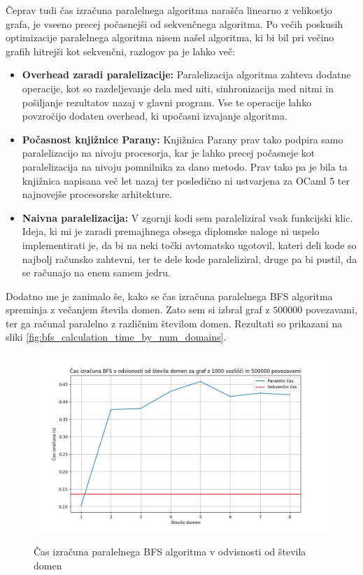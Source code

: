 \documentclass[mat1, tisk]{fmfdelo}
\begin{document}
Čeprav tudi čas izračuna paralelnega algoritma narašča linearno z velikostjo grafa, je vseeno precej počasnejši od
sekvenčnega algoritma. Po večih poskusih optimizacije paralelnega algoritma nisem našel algoritma, ki bi bil pri
večino grafih hitrejši kot sekvenčni, razlogov pa je lahko več:
\begin{itemize}
  \item \textbf{Overhead zaradi paralelizacije: } Paralelizacija algoritma zahteva dodatne operacije, kot so 
        razdeljevanje dela med niti, sinhronizacija med nitmi in pošiljanje rezultatov nazaj v glavni program. 
        Vse te operacije lahko povzročijo dodaten overhead, ki upočasni izvajanje algoritma.
  \item \textbf{Počasnost knjižnice Parany: } Knjižnica Parany prav tako podpira samo paralelizacijo na nivoju
        procesorja, kar je lahko precej počasneje kot paralelizacija na nivoju pomnilnika za dano metodo. Prav tako
        pa je bila ta knjižnica napisana več let nazaj ter posledično ni ustvarjena za OCaml 5 ter najnovejše
        procesorske arhitekture.
  \item \textbf{Naivna paralelizacija: } V zgornji kodi sem paraleliziral vsak funkcijski klic. Ideja, ki mi je zaradi
        premajhnega obsega diplomske naloge ni uspelo implementirati je, da bi na neki točki avtomatsko ugotovil,
        kateri deli kode so najbolj računsko zahtevni, ter te dele kode paraleliziral, druge pa bi pustil, da se
        računajo na enem samem jedru.
\end{itemize}

Dodatno me je zanimalo še, kako se čas izračuna paralelnega BFS algoritma spreminja z večanjem števila domen.
Zato sem si izbral graf z $500000$ povezavami, ter ga računal paralelno z različnim številom domen. Rezultati so
prikazani na sliki \ref{fig:bfs_calculation_time_by_num_domains}.

\begin{figure}[h!]
  \centering
  \caption{Čas izračuna paralelnega BFS algoritma v odvisnosti od števila domen}
  \includegraphics[width=15cm]{slike/bfs_v_odvisnosti_od_stevila_domen.jpg}
  \label{fig:bfs_calculation_time_by_graph_size}
\end{figure}
\end{document}
